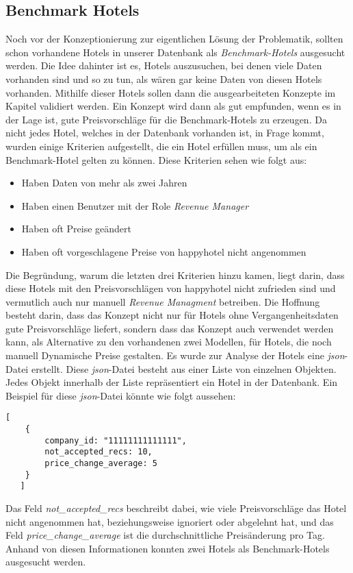 \subsection{Benchmark Hotels}
\label{subsec:bench_hotels}
Noch vor der Konzeptionierung zur eigentlichen Lösung der Problematik, sollten schon vorhandene Hotels in unserer Datenbank als \emph{Benchmark-Hotels} ausgesucht werden. Die Idee dahinter ist es, Hotels auszusuchen, bei denen viele Daten vorhanden sind und so zu tun, als wären gar keine Daten von diesen Hotels vorhanden. Mithilfe dieser Hotels sollen dann die ausgearbeiteten Konzepte im Kapitel \emph{} validiert werden. Ein Konzept wird dann als gut empfunden, wenn es in der Lage ist, gute Preisvorschläge für die Benchmark-Hotels zu erzeugen.
\newline
\newline
Da nicht jedes Hotel, welches in der Datenbank vorhanden ist, in Frage kommt, wurden einige Kriterien aufgestellt, die ein Hotel erfüllen muss, um als ein Benchmark-Hotel gelten zu können. Diese Kriterien sehen wie folgt aus:

\begin{itemize}
    \item Haben Daten von mehr als zwei Jahren
    \item Haben einen Benutzer mit der Role \emph{Revenue Manager}
    \item Haben oft Preise geändert
    \item Haben oft vorgeschlagene Preise von happyhotel nicht angenommen
\end{itemize}

Die Begründung, warum die letzten drei Kriterien hinzu kamen, liegt darin, dass diese Hotels mit den Preisvorschlägen von happyhotel nicht zufrieden sind und vermutlich auch nur manuell \emph{Revenue Managment} betreiben. Die Hoffnung besteht darin, dass das Konzept nicht nur für Hotels ohne Vergangenheitsdaten gute Preisvorschläge liefert, sondern dass das Konzept auch verwendet werden kann, als Alternative zu den vorhandenen zwei Modellen, für Hotels, die noch manuell Dynamische Preise gestalten.
\newline
\newline
Es wurde zur Analyse der Hotels eine \emph{json}-Datei erstellt. Diese \emph{json}-Datei besteht aus einer Liste von einzelnen Objekten. Jedes Objekt innerhalb der Liste repräsentiert ein Hotel in der Datenbank. Ein Beispiel für diese \emph{json}-Datei könnte wie folgt aussehen:

\begin{lstlisting}[style=json, caption=Beispielhafte json-Datei,
    label=lst:json_file]
   [
    {
        company_id: "11111111111111",
        not_accepted_recs: 10,
        price_change_average: 5
    }
   ]
\end{lstlisting}

Das Feld \emph{not\_accepted\_recs} beschreibt dabei, wie viele Preisvorschläge das Hotel nicht angenommen hat, beziehungsweise ignoriert oder abgelehnt hat, und das Feld \emph{price\_change\_average} ist die durchschnittliche Preisänderung pro Tag. Anhand von diesen Informationen konnten zwei Hotels als Benchmark-Hotels ausgesucht werden.